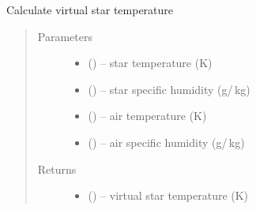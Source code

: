 \documentclass[letterpaper,10pt,english]{sphinxmanual}
\begin{document}
\begin{fulllineitems}
\label{\detokenize{index:flux_subs.get_tsrv}}
Calculate virtual star temperature 

\begin{quote}\begin{description}
\item[{Parameters}] \leavevmode
\begin{itemize}
\item {} 
(\href{https://docs.python.org/3/library/functions.html\#float}{}) -- star temperature (K)

\item {} 
(\href{https://docs.python.org/3/library/functions.html\#float}{}) -- star specific humidity (g\slash\,kg)

\item {} 
(\href{https://docs.python.org/3/library/functions.html\#float}{}) -- air temperature (K)

\item {} 
(\href{https://docs.python.org/3/library/functions.html\#float}{}) -- air specific humidity (g\slash\,kg)
\end{itemize}

\item[{Returns}] \leavevmode
\begin{itemize}
\item {} 
(\href{https://docs.python.org/3/library/functions.html\#float}{}) -- virtual star temperature (K)
\end{itemize}
\end{description}\end{quote}

\end{fulllineitems}

\end{document}
